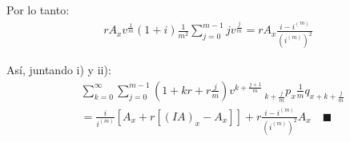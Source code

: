 Por lo tanto:
\begin{align}
r A_x v^{\frac{1}{m}} (1 + i) \frac{1}{m^2} \sum_{j=0}^{m-1} j v^{\frac{j}{m}} = r A_x \frac{i - i^{(m)}}{(i^{(m)})^2}
\end{align}

Así, juntando i) y ii):
\begin{align}
&\sum_{k=0}^{\infty} \sum_{j=0}^{m-1} \left(1 + kr + r\frac{j}{m}\right) v^{k+\frac{j+1}{m}} \,_{k+\frac{j}{m}}p_x \frac{1}{m} q_{x+k+\frac{j}{m}} \\
&= \frac{i}{i^{(m)}}[A_x + r[(IA)_x - A_x]] + r\frac{i - i^{(m)}}{(i^{(m)})^2} A_x \quad \blacksquare
\end{align}